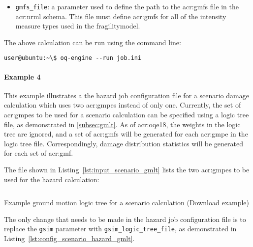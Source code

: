 \begin{itemize}

  \item \Verb+gmfs_file+: a parameter used to define the path
	  to the \glspl{acr:gmf} file in the \gls{acr:nrml} schema. This file must
    define \glspl{acr:gmf} for all of the intensity measure types used in the
    \gls{fragilitymodel}.

\end{itemize}

The above calculation can be run using the command line:

\begin{verbatim}
user@ubuntu:~\$ oq-engine --run job.ini
\end{verbatim}


\paragraph{Example 4}

This example illustrates a the hazard job configuration file for a scenario
damage calculation which uses two \glspl{acr:gmpe} instead of only one.
Currently, the set of \glspl{acr:gmpe} to be used for a scenario calculation
can be specified using a logic tree file, as demonstrated in
\ref{subsec:gmlt}. As of \glsdesc{acr:oqe18}, the weights in the logic tree
are ignored, and a set of \glspl{acr:gmf} will be generated for each
\gls{acr:gmpe} in the logic tree file. Correspondingly, damage distribution
statistics will be generated for each set of \gls{acr:gmf}.

The file shown in Listing~\ref{lst:input_scenario_gmlt} lists the two
\glspl{acr:gmpe} to be used for the hazard calculation:

\begin{listing}[htbp]
  \inputminted[firstline=1,firstnumber=1,fontsize=\footnotesize,frame=single,linenos,bgcolor=lightgray,label=gsim\_logic\_tree.xml]{xml}{oqum/risk/verbatim/input_scenario_gmlt.xml}
  \caption{Example ground motion logic tree for a scenario calculation (\href{https://raw.githubusercontent.com/GEMScienceTools/oq-engine-docs/master/oqum/risk/verbatim/input_scenario_gmlt.xml}{Download example})}
  \label{lst:input_scenario_gmlt}
\end{listing}

The only change that needs to be made in the hazard job configuration file is
to replace the \Verb+gsim+ parameter with \Verb+gsim_logic_tree_file+, as
demonstrated in Listing~\ref{lst:config_scenario_hazard_gmlt}.


